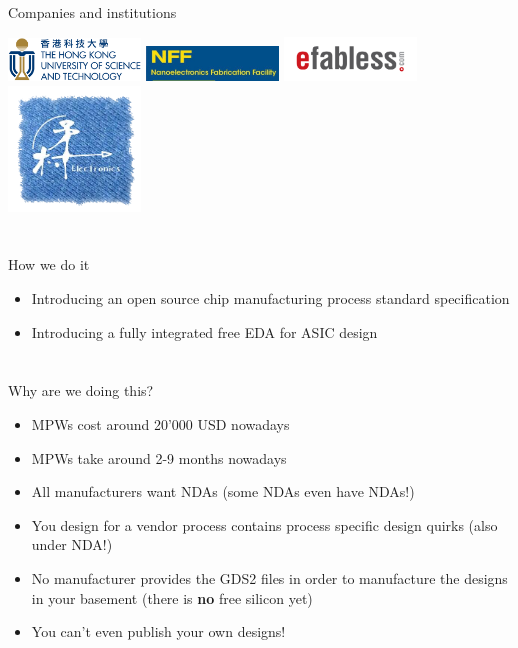 \documentclass[9pt]{beamer}
\begin{document}
\begin{frame}{Companies and institutions}
	\begin{center}
		\includegraphics[width=100pt]{HKUST_Logo.png}
		\includegraphics[width=100pt]{NFF.jpg}
		\includegraphics[width=100pt]{efabless_logo.png} \\
		\includegraphics[width=100pt]{Lanceville.png}
	\end{center}
\end{frame}

\section[How]{}
\begin{frame}{How we do it}
	\begin{itemize}
		\item Introducing an open source chip manufacturing process standard specification
		\item Introducing a fully integrated free EDA for ASIC design\footnotemark
	\end{itemize}

\end{frame}

\section[Why]{}
\begin{frame}{Why are we doing this?}
	\begin{itemize}
		\item MPWs cost around 20'000 USD nowadays
		\item MPWs take around 2-9 months nowadays
		\item All manufacturers want NDAs (some NDAs even have NDAs!)
		\item You design for a vendor process contains process specific design quirks (also under NDA!)
		\item No manufacturer provides the GDS2 files in order to manufacture the designs in your basement (there is \textbf{no} free silicon yet)
		\item You can't even publish your own designs!
	\end{itemize}
\end{frame}
\end{document}
